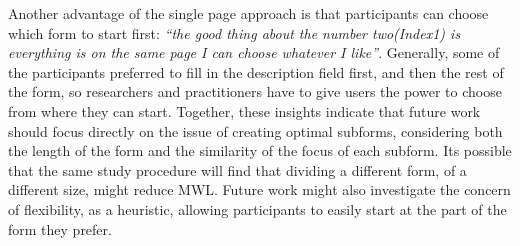 \documentclass[../main/Replicate.tex]{subfiles}
\begin{document}

	Another advantage of the single page approach is that participants can choose which form to start first: \textit{``the good thing about the number two(Index1) is everything is on the same page I can choose whatever I like''}.
	Generally, some of the participants preferred to fill in the description field first, and then the rest of the form, so researchers and practitioners have to give users the power to choose from where they can start. Together, these insights indicate that future work should focus directly on the issue of creating optimal subforms, considering both the length of the form and the similarity of the focus of each subform. Its possible that the same study procedure will find that dividing a different form, of a different size, might reduce MWL. Future work might also investigate the concern of flexibility, as a heuristic, allowing participants to easily start at the part of the form they prefer.

	
\end{document}
